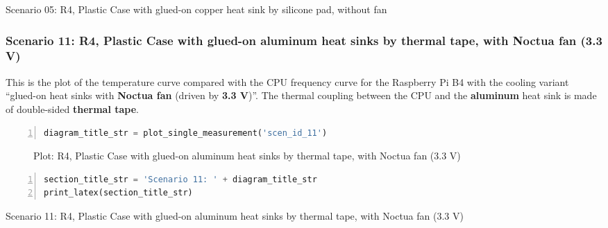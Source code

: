 \documentclass[10pt,parskip=half,
toc=sectionentrywithdots,
bibliography=totocnumbered,
captions=tableheading,numbers=noendperiod]{scrartcl}
\begin{document}
\begin{table}[H]
\centering
\begin{adjustbox}{max width=\textwidth}
Scenario 05: R4, Plastic Case with glued-on copper heat sink by silicone pad, without fan
\end{adjustbox}
\end{table}

\hypertarget{scenario-11-r4-plastic-case-with-glued-on-aluminum-heat-sinks-by-thermal-tape-with-noctua-fan-3.3-v}{%
\subsubsection{Scenario 11: R4, Plastic Case with glued-on aluminum heat
sinks by thermal tape, with Noctua fan (3.3
V)}\label{scenario-11-r4-plastic-case-with-glued-on-aluminum-heat-sinks-by-thermal-tape-with-noctua-fan-3.3-v}}

This is the plot of the temperature curve compared with the CPU
frequency curve for the Raspberry Pi B4 with the cooling variant
``glued-on heat sinks with \textbf{Noctua fan} (driven by \textbf{3.3
V})''. The thermal coupling between the CPU and the \textbf{aluminum}
heat sink is made of double-sided \textbf{thermal tape}.

\begin{lstlisting}[language=Python,numbers=left,xleftmargin=20pt,xrightmargin=5pt,belowskip=5pt,aboveskip=5pt]
diagram_title_str = plot_single_measurement('scen_id_11')
\end{lstlisting}

\begin{figure}[H]\begin{center}\end{center}\caption{Plot: R4, Plastic Case with glued-on aluminum heat sinks by thermal
tape, with Noctua fan (3.3 V)}\end{figure}

\begin{lstlisting}[language=Python,numbers=left,xleftmargin=20pt,xrightmargin=5pt,belowskip=5pt,aboveskip=5pt]
section_title_str = 'Scenario 11: ' + diagram_title_str
print_latex(section_title_str)
\end{lstlisting}

\begin{table}[H]
\centering
\begin{adjustbox}{max width=\textwidth}
Scenario 11: R4, Plastic Case with glued-on aluminum heat sinks by thermal tape, with Noctua fan (3.3 V)
\end{adjustbox}
\end{table}
\end{document}
